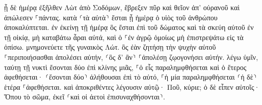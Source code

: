 \documentclass{openreader}
\begin{document}
ᾗ δὲ ἡμέρᾳ ἐξῆλθεν Λὼτ ἀπὸ Σοδόμων, ἔβρεξεν πῦρ καὶ θεῖον ἀπ’ οὐρανοῦ καὶ ἀπώλεσεν ⸀πάντας. 
κατὰ ⸂τὰ αὐτὰ⸃ ἔσται ᾗ ἡμέρᾳ ὁ υἱὸς τοῦ ἀνθρώπου ἀποκαλύπτεται. 
ἐν ἐκείνῃ τῇ ἡμέρᾳ ὃς ἔσται ἐπὶ τοῦ δώματος καὶ τὰ σκεύη αὐτοῦ ἐν τῇ οἰκίᾳ, μὴ καταβάτω ἆραι αὐτά, καὶ ὁ ⸀ἐν ἀγρῷ ὁμοίως μὴ ἐπιστρεψάτω εἰς τὰ ὀπίσω. 
μνημονεύετε τῆς γυναικὸς Λώτ. 
ὃς ἐὰν ζητήσῃ τὴν ψυχὴν αὐτοῦ ⸀περιποιήσασθαι ἀπολέσει αὐτήν, ⸂ὃς δ’ ἂν⸃ ⸀ἀπολέσῃ ζῳογονήσει αὐτήν. 
λέγω ὑμῖν, ταύτῃ τῇ νυκτὶ ἔσονται δύο ἐπὶ κλίνης μιᾶς, ⸀ὁ εἷς παραλημφθήσεται καὶ ὁ ἕτερος ἀφεθήσεται· 
⸂ἔσονται δύο⸃ ἀλήθουσαι ἐπὶ τὸ αὐτό, ⸀ἡ μία παραλημφθήσεται ⸂ἡ δὲ⸃ ἑτέρα ⸀ἀφεθήσεται. 
καὶ ἀποκριθέντες λέγουσιν αὐτῷ· Ποῦ, κύριε; ὁ δὲ εἶπεν αὐτοῖς· Ὅπου τὸ σῶμα, ἐκεῖ ⸂καὶ οἱ ἀετοὶ ἐπισυναχθήσονται⸃. 
\end{document}
